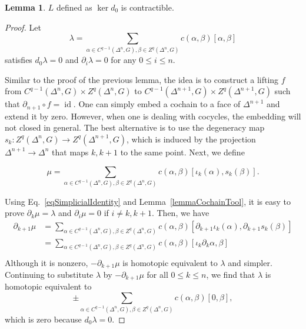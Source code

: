 \documentclass[reprint, amsmath, amssymb, showpacs, floatfix, longbibliography, aps, twocolumn, superscriptaddress, nofootinbib]{revtex4-2}
\newcommand{\id}{{\operatorname{id}}}
\theoremstyle{definition}
\newtheorem{lemma}{Lemma}[section]
\begin{document}
\begin{lemma}
	$L$ defined as $\ker d_0$ is contractible.
\end{lemma}

\begin{proof}
	Let 
	\begin{equation}
		\lambda=\sum_{\alpha\in C^{q-1}(\Delta^n,G),\beta\in Z^q(\Delta^n,G)}c(\alpha,\beta)[\alpha,\beta]
	\end{equation}
	satisfies $d_0\lambda=0$ and $\partial_i\lambda=0$ for any $0\le i\le n$.
	
	
	Similar to the proof of the previous lemma, the idea is to construct a lifting $f$ from $C^{q-1}(\Delta^n,G)\times Z^{q}(\Delta^n,G)$ to $C^{q-1}(\Delta^{n+1},G)\times Z^{q}(\Delta^{n+1},G)$ such that $\partial_{n+1}\circ f=\id$.
	 One can simply embed a cochain to a face of $\Delta^{n+1}$ and extend it by zero. However, when one is dealing with cocycles, the embedding will not closed in general. The best alternative is to use the degeneracy map $s_k: Z^q(\Delta^n,G)\rightarrow Z^q(\Delta^{n+1},G)$, which is induced by the projection $\Delta^{n+1}\rightarrow \Delta^n$ that maps $k,k+1$ to the same point. Next, we define
	
	\begin{equation}
		\mu=\sum_{\alpha\in C^{q-1}(\Delta^n,G),\beta\in Z^q(\Delta^n,G)}c(\alpha,\beta)[\iota_k(\alpha),s_k(\beta)].
	\end{equation}	
	
	Using Eq.~\eqref{eqSimplicialIdentity} and Lemma~\ref{lemmaCochainTool}, it is easy to prove $\partial_k\mu=\lambda$ and $\partial_i\mu=0$ if $i\ne k,k+1$. Then, we have
	\begin{equation}
		\begin{aligned}
			\partial_{k+1}\mu&=\sum_{\alpha\in C^{q-1}(\Delta^n,G),\beta\in Z^q(\Delta^n,G)}c(\alpha,\beta)[\partial_{k+1}\iota_k(\alpha),\partial_{k+1}s_k(\beta)]\\&=\sum_{\alpha\in C^{q-1}(\Delta^n,G),\beta\in Z^q(\Delta^n,G)}c(\alpha,\beta)[\iota_k\partial_{k}\alpha,\beta]\\
		\end{aligned}
	\end{equation}
	Although it is nonzero, $-\partial_{k+1}\mu$ is homotopic equivalent to $\lambda$ and simpler. Continuing to substitute $\lambda$ by $-\partial_{k+1}\mu$ for all $0\le k\le n$, we find that $\lambda$ is homotopic equivalent to
		\begin{equation}
		\pm\sum_{\alpha\in C^{q-1}(\Delta^n,G),\beta\in Z^q(\Delta^n,G)}c(\alpha,\beta)[0,\beta],
	\end{equation}
	which is zero because $d_0\lambda=0$.
\end{proof}
\end{document}
